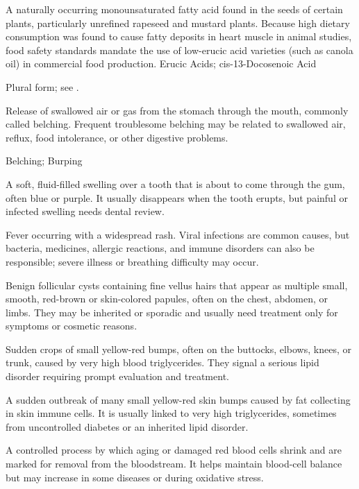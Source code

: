  A naturally occurring monounsaturated fatty acid found in the seeds of certain plants, particularly unrefined rapeseed and mustard plants. Because high dietary consumption was found to cause fatty deposits in heart muscle in animal studies, food safety standards mandate the use of low-erucic acid varieties (such as canola oil) in commercial food production.
\synonyms
Erucic Acids; cis-13-Docosenoic Acid

 Plural form; see .

 Release of swallowed air or gas from the stomach through the mouth, commonly called belching. Frequent troublesome belching may be related to swallowed air, reflux, food intolerance, or other digestive problems.

\synonyms
Belching; Burping

 A soft, fluid-filled swelling over a tooth that is about to come through the gum, often blue or purple. It usually disappears when the tooth erupts, but painful or infected swelling needs dental review.

 Fever occurring with a widespread rash. Viral infections are common causes, but bacteria, medicines, allergic reactions, and immune disorders can also be responsible; severe illness or breathing difficulty may occur.

 Benign follicular cysts containing fine vellus hairs that appear as multiple small, smooth, red-brown or skin-colored papules, often on the chest, abdomen, or limbs. They may be inherited or sporadic and usually need treatment only for symptoms or cosmetic reasons.

 Sudden crops of small yellow-red bumps, often on the buttocks, elbows, knees, or trunk, caused by very high blood triglycerides. They signal a serious lipid disorder requiring prompt evaluation and treatment.

 A sudden outbreak of many small yellow-red skin bumps caused by fat collecting in skin immune cells. It is usually linked to very high triglycerides, sometimes from uncontrolled diabetes or an inherited lipid disorder.

 A controlled process by which aging or damaged red blood cells shrink and are marked for removal from the bloodstream. It helps maintain blood-cell balance but may increase in some diseases or during oxidative stress.

